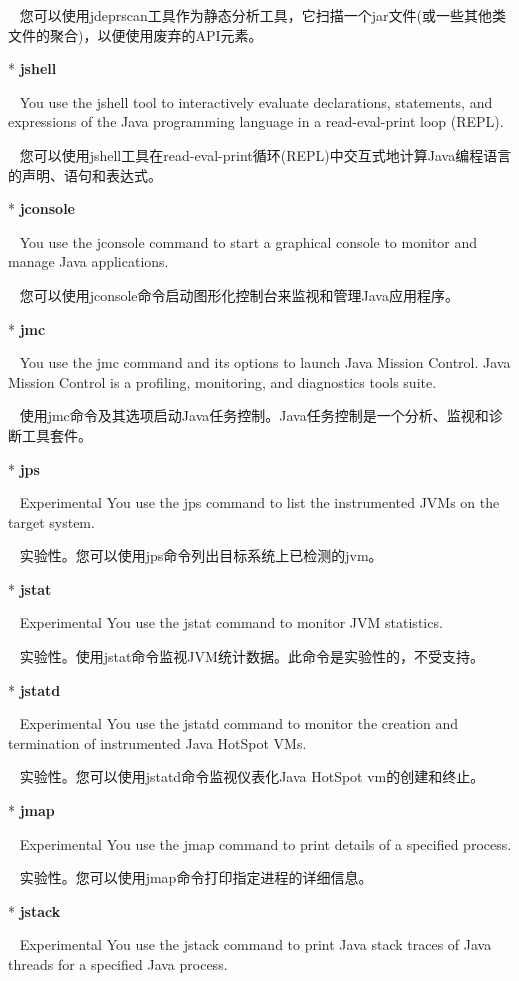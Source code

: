 ~ 您可以使用jdeprscan工具作为静态分析工具，它扫描一个jar文件(或一些其他类文件的聚合)，以便使用废弃的API元素。

* \textbf{jshell}

~ You use the jshell tool to interactively evaluate declarations, statements, and expressions of the Java programming language in a read-eval-print loop (REPL).

~ 您可以使用jshell工具在read-eval-print循环(REPL)中交互式地计算Java编程语言的声明、语句和表达式。

* \textbf{jconsole} 

~ You use the jconsole command to start a graphical console to monitor and manage Java applications.

~ 您可以使用jconsole命令启动图形化控制台来监视和管理Java应用程序。

* \textbf{jmc} 

~ You use the jmc command and its options to launch Java Mission Control. Java Mission Control is a profiling, monitoring, and diagnostics tools suite.

~ 使用jmc命令及其选项启动Java任务控制。Java任务控制是一个分析、监视和诊断工具套件。        

* \textbf{jps}

~ Experimental You use the jps command to list the instrumented JVMs on the target system.

~ 实验性。您可以使用jps命令列出目标系统上已检测的jvm。

* \textbf{jstat} 

~ Experimental You use the jstat command to monitor JVM statistics. 

~ 实验性。使用jstat命令监视JVM统计数据。此命令是实验性的，不受支持。

* \textbf{jstatd} 

~ Experimental You use the jstatd command to monitor the creation and termination of instrumented Java HotSpot VMs. 

~ 实验性。您可以使用jstatd命令监视仪表化Java HotSpot vm的创建和终止。

* \textbf{jmap}

~ Experimental You use the jmap command to print details of a specified process. 

~ 实验性。您可以使用jmap命令打印指定进程的详细信息。

* \textbf{jstack}

~ Experimental You use the jstack command to print Java stack traces of Java threads for a specified Java process. 

